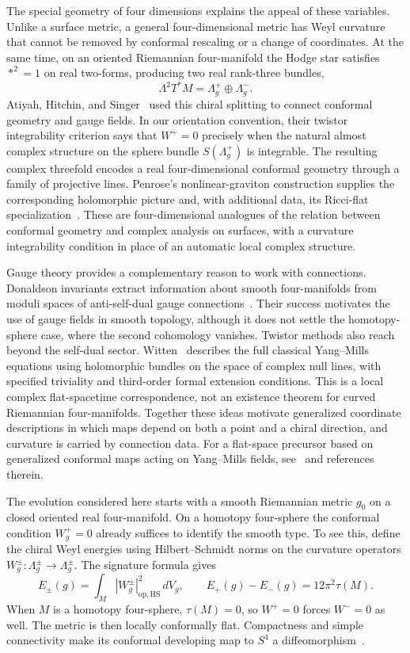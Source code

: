 \documentclass[11pt]{article}
\numberwithin{equation}{section}
\begin{document}
The special geometry of four dimensions explains the appeal of these
variables. Unlike a surface metric, a general four-dimensional metric has
Weyl curvature that cannot be removed by conformal rescaling or a change
of coordinates. At the same time, on an oriented Riemannian four-manifold
the Hodge star satisfies \(*^2=1\) on real two-forms, producing two real
rank-three bundles,
\[
 \Lambda^2T^*M=\Lambda_g^+\oplus\Lambda_g^-.
\]
Atiyah, Hitchin, and Singer~\cite{AHS1978} used this chiral splitting to
connect conformal geometry and gauge fields. In our orientation convention,
their twistor integrability criterion says that \(W^+=0\) precisely when
the natural almost complex
structure on the sphere bundle \(S(\Lambda_g^+)\) is integrable.
The resulting complex threefold encodes a real four-dimensional conformal
geometry through a family of projective lines. Penrose's nonlinear-graviton
construction supplies the corresponding
holomorphic picture and, with additional data, its Ricci-flat
specialization~\cite{Penrose1976}. These are four-dimensional analogues of
the relation between conformal geometry and complex analysis on surfaces,
with a curvature integrability condition in place of an automatic local
complex structure.

Gauge theory provides a complementary reason to work with connections.
Donaldson invariants extract information about smooth four-manifolds from
moduli spaces of anti-self-dual gauge connections~\cite{DonaldsonKronheimer1990}.
Their success motivates the use of gauge fields in smooth topology,
although it does not settle the
homotopy-sphere case, where the second cohomology vanishes. Twistor methods
also reach beyond the self-dual sector. Witten~\cite{Witten1978} describes
the full classical Yang--Mills equations using holomorphic bundles on the
space of complex null lines, with specified triviality and third-order
formal extension conditions. This is a local
complex flat-spacetime correspondence, not an existence theorem for curved
Riemannian four-manifolds. Together these ideas motivate generalized
coordinate descriptions in which maps depend on both a point and a chiral
direction, and curvature is carried by connection data. For a flat-space
precursor based on generalized conformal maps acting on Yang--Mills fields,
see~\cite{Baker2023} and references therein.

The evolution considered here starts with a smooth Riemannian metric
\(g_0\) on a closed oriented real four-manifold. On a homotopy
four-sphere the conformal condition \(W_g^+=0\) already suffices to
identify the smooth type. To see this, define the chiral Weyl energies
using Hilbert--Schmidt norms on the curvature operators
\(W^\pm_g:\Lambda_g^\pm\to\Lambda_g^\pm\). The signature formula gives
\begin{equation}\label{eq:chiral-weyl-energy}
 E_\pm(g)=\int_M |W^\pm_g|^2_{\mathrm{op,HS}}\,dV_g,
 \qquad E_+(g)-E_-(g)=12\pi^2\tau(M).
\end{equation}
When \(M\) is a homotopy four-sphere, \(\tau(M)=0\), so \(W^+=0\)
forces \(W^-=0\) as well. The metric is then locally conformally flat.
Compactness and simple connectivity make its conformal developing map
to \(S^4\) a diffeomorphism~\cite{Hirzebruch1971Signature,Kuiper1949}.
\end{document}
